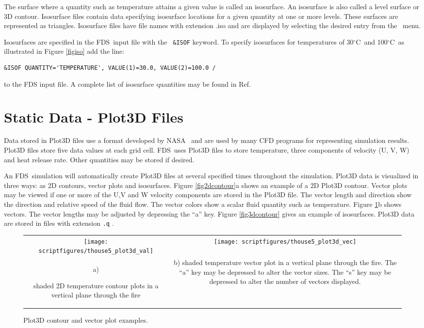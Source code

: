 \documentclass[11pt,twoside]{book}
\newcommand{\degC}{$^\circ$C}
\newcommand{\figoptions}{hbp}
\newcommand{\FDS}{{FDS}}
\newcommand{\fds}{{FDS}}
\newcommand{\loadmenu}{\fbox{\tt Load/Unload} }
\begin{document}
The surface where a quantity such as temperature attains a given
value is called an isosurface. An isosurface is also called a
level surface or 3D contour. Isosurface files contain data
specifying isosurface locations for a given quantity at one or
more levels. These surfaces are represented as triangles.
Isosurface files have file names with extension .iso and are
displayed by selecting the desired entry from the \loadmenu\ menu.

Isosurfaces are specified in the \fds\ input file with the {\tt
\&ISOF} keyword.  To specify isosurfaces for temperatures of
30\degC\ and 100\degC\ as illustrated in Figure \ref{figiso} add
the line:
\begin{verbatim}
&ISOF QUANTITY='TEMPERATURE', VALUE(1)=30.0, VALUE(2)=100.0 /
\end{verbatim}
to the FDS input file.  A complete list of isosurface quantities may be
found in Ref.~\cite{FDS_Users_Guide_5}

\section{Static Data - Plot3D Files} Data stored in Plot3D files
use a format developed by NASA~\cite{PLOT3D} and are used by many
CFD programs for representing simulation results. Plot3D files
store five data values at each grid cell. \FDS\ uses Plot3D files
to store temperature, three components of velocity (U, V, W) and
heat release rate. Other quantities may be stored if desired.

An \fds\ simulation will automatically  create Plot3D files at several
specified times throughout the simulation. Plot3D data is
visualized in three ways: as 2D contours, vector plots and
isosurfaces. Figure \ref{fig2dcontour}a shows an example of a 2D
Plot3D contour. Vector plots may be viewed if one or more of the
U,V and W velocity components are stored in the Plot3D file. The
vector length and direction show the direction and relative speed
of the fluid flow. The vector colors show a scalar fluid quantity
such as temperature. Figure \ref{figvector2}b shows vectors.
The vector lengths may be adjusted by depressing the
``a'' key.  Figure \ref{fig3dcontour}
gives an example of isosurfaces.
Plot3D data are stored in files with extension {\tt .q} .

\begin{figure}[\figoptions]
\begin{center}
\begin{tabular}{cc}
\texttt{[image: scriptfigures/thouse5\_plot3d\_val]}
&\texttt{[image: scriptfigures/thouse5\_plot3d\_vec]}\\
a)

\parbox[t]{2.5in}{shaded 2D temperature contour plots in a vertical plane through the fire}
&
b)
\parbox[t]{2.5in}{shaded temperature vector plot in a vertical plane through the fire.
The ``a'' key may be depressed to alter the vector sizes.
The ``s'' key may be depressed to alter the number of vectors displayed.
}
\end{tabular}
\end{center}
\caption{Plot3D contour and vector plot examples.  }
\label{fig2dcontour}%
\label{figvector2}
\end{figure}
\end{document}
